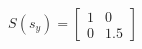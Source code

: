 \documentclass[preview]{standalone}
\begin{document}
\begin{align*}
S(s_y) = \begin{bmatrix} 1 & 0 \\ 0 & 1.5 \end{bmatrix}
\end{align*}
\end{document}
